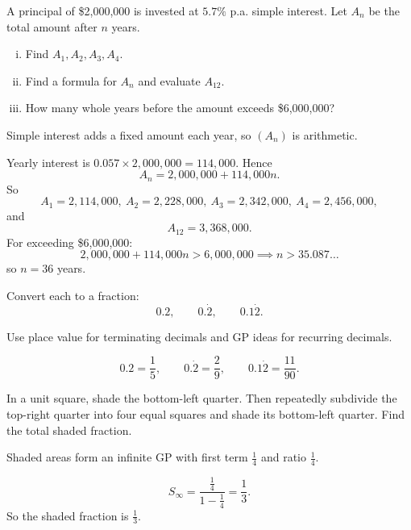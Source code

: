 \begin{problem}
A principal of \$2,000,000 is invested at $5.7\%$ p.a. simple interest.
Let $A_n$ be the total amount after $n$ years.
\begin{enumerate}[(i)]
\item Find $A_1,A_2,A_3,A_4$.
\item Find a formula for $A_n$ and evaluate $A_{12}$.
\item How many whole years before the amount exceeds \$6,000,000?
\end{enumerate}
\end{problem}
\begin{hint}
Simple interest adds a fixed amount each year, so $(A_n)$ is arithmetic.
\end{hint}
\begin{solution}
Yearly interest is $0.057\times 2{,}000{,}000=114{,}000$.
Hence
\[
A_n=2{,}000{,}000+114{,}000n.
\]
So
\[
A_1=2{,}114{,}000,\ A_2=2{,}228{,}000,\ A_3=2{,}342{,}000,\ A_4=2{,}456{,}000,
\]
and
\[
A_{12}=3{,}368{,}000.
\]
For exceeding \$6,000,000:
\[
2{,}000{,}000+114{,}000n>6{,}000{,}000
\implies n>35.087\ldots
\]
so $n=36$ years.
\end{solution}

\begin{problem}
Convert each to a fraction:
\[
0.2,\qquad 0.\dot{2},\qquad 0.1\dot{2}.
\]
\end{problem}
\begin{hint}
Use place value for terminating decimals and GP ideas for recurring decimals.
\end{hint}
\begin{solution}
\[
0.2=\frac15,\qquad 0.\dot{2}=\frac29,\qquad 0.1\dot{2}=\frac{11}{90}.
\]
\end{solution}

\begin{problem}
In a unit square, shade the bottom-left quarter. Then repeatedly subdivide the top-right quarter into four equal squares and shade its bottom-left quarter.
Find the total shaded fraction.
\end{problem}
\begin{hint}
Shaded areas form an infinite GP with first term $\frac14$ and ratio $\frac14$.
\end{hint}
\begin{solution}
\[
S_\infty=\frac{\frac14}{1-\frac14}=\frac13.
\]
So the shaded fraction is $\frac13$.
\end{solution}

